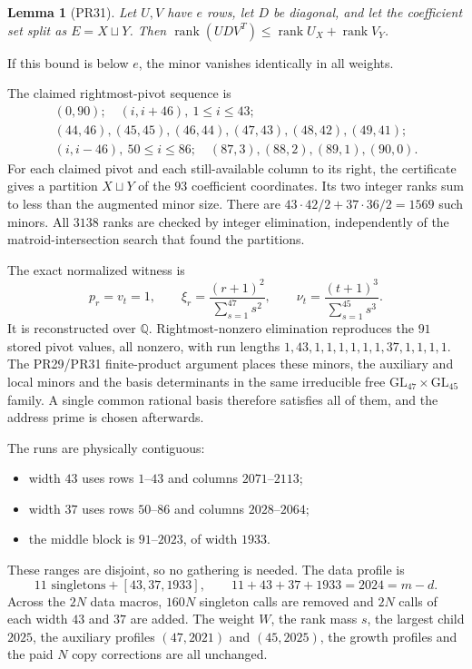 \documentclass[11pt]{article}
\newtheorem{lemma}{Lemma}
\begin{document}
\begin{lemma}[PR31]
Let $U,V$ have $e$ rows, let $D$ be diagonal, and let the coefficient set
split as $E=X\sqcup Y$. Then
$\operatorname{rank}(UDV^T)\le\operatorname{rank}U_X+\operatorname{rank}V_Y$.
\end{lemma}
If this bound is below $e$, the minor vanishes identically in all weights.

The claimed rightmost-pivot sequence is
\[
\begin{gathered}
(0,90);\quad(i,i+46),\ 1\le i\le43;\\
(44,46),(45,45),(46,44),(47,43),(48,42),(49,41);\\
(i,i-46),\ 50\le i\le86;\quad(87,3),(88,2),(89,1),(90,0).
\end{gathered}
\]
For each claimed pivot and each still-available column to its right, the
certificate gives a partition $X\sqcup Y$ of the $93$ coefficient
coordinates. Its two integer ranks sum to less than the augmented minor
size. There are $43\cdot42/2+37\cdot36/2=1569$ such minors. All $3138$
ranks are checked by integer elimination, independently of the
matroid-intersection search that found the partitions.

The exact normalized witness is
\[
p_r=v_t=1,\qquad \xi_r=\frac{(r+1)^2}{\sum_{s=1}^{47}s^2},\qquad
\nu_t=\frac{(t+1)^3}{\sum_{s=1}^{45}s^3}.
\]
It is reconstructed over $\mathbb Q$. Rightmost-nonzero elimination
reproduces the $91$ stored pivot values, all nonzero, with run lengths
$1,43,1,1,1,1,1,1,37,1,1,1,1$. The PR29/PR31 finite-product argument places
these minors, the auxiliary and local minors and the basis determinants in
the same irreducible free $\mathrm{GL}_{47}\times\mathrm{GL}_{45}$ family. A
single common rational basis therefore satisfies all of them, and the
address prime is chosen afterwards.

The runs are physically contiguous:
\begin{itemize}
\item width $43$ uses rows $1$--$43$ and columns $2071$--$2113$;
\item width $37$ uses rows $50$--$86$ and columns $2028$--$2064$;
\item the middle block is $91$--$2023$, of width $1933$.
\end{itemize}
These ranges are disjoint, so no gathering is needed. The data profile is
\[
11\text{ singletons}+[43,37,1933],\qquad 11+43+37+1933=2024=m-d.
\]
Across the $2N$ data macros, $160N$ singleton calls are removed and $2N$
calls of each width $43$ and $37$ are added. The weight $W$, the rank mass
$s$, the largest child $2025$, the auxiliary profiles $(47,2021)$ and
$(45,2025)$, the growth profiles and the paid $N$ copy corrections are all
unchanged.
\end{document}
